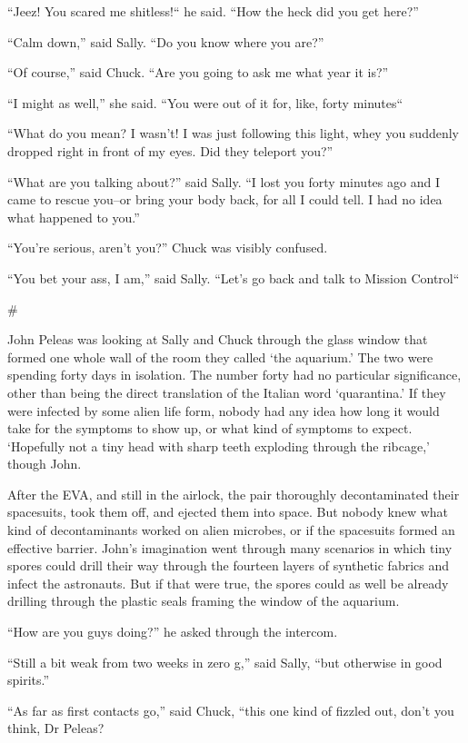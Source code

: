 \documentclass[12pt]{book}
\newcommand{\sbreak}{
\begin{center}
  \#
\end{center}
}
\begin{document}
``Jeez! You scared me shitless!`` he said. ``How the heck did you get here?''

``Calm down,'' said Sally. ``Do you know where you are?''

``Of course,'' said Chuck. ``Are you going to ask me what year it is?''

``I might as well,'' she said. ``You were out of it for, like, forty minutes``

``What do you mean? I wasn't! I was just following this light, whey you suddenly dropped right in front of my eyes. Did they teleport you?''

``What are you talking about?'' said Sally. ``I lost you forty minutes ago and I came to rescue you--or bring your body back, for all I could tell. I had no idea what happened to you.''

``You're serious, aren't you?'' Chuck was visibly confused. 

``You bet your ass, I am,'' said Sally. ``Let's go back and talk to Mission Control``

\sbreak

John Peleas was looking at Sally and Chuck through the glass window that formed one whole wall of the room they called `the aquarium.' The two were spending forty days in isolation. The number forty had no particular significance, other than being the direct translation of the Italian word `quarantina.' If they were infected by some alien life form, nobody had any idea how long it would take for the symptoms to show up, or what kind of symptoms to expect. `Hopefully not a tiny head with sharp teeth exploding through the ribcage,' though John.

After the EVA, and still in the airlock, the pair thoroughly decontaminated their spacesuits,  took them off, and ejected them into space. But nobody knew what kind of decontaminants worked on alien microbes, or if the spacesuits formed an effective barrier. John's imagination went through many scenarios in which tiny spores could drill their way through the fourteen layers of synthetic fabrics and infect the astronauts. But if that were true, the spores could as well be already drilling through the plastic seals framing the window of the aquarium. 

``How are you guys doing?'' he asked through the intercom. 

``Still a bit weak from two weeks in zero g,'' said Sally, ``but otherwise in good spirits.''

``As far as first contacts go,'' said Chuck, ``this one kind of fizzled out, don't you think, Dr Peleas?
\end{document}
